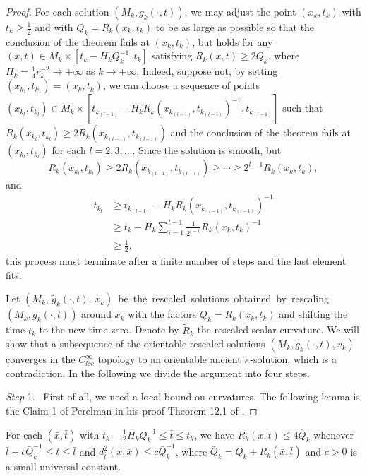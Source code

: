\begin{proof}
For each solution $(M_k,g_k(\cdot,t))$, we may adjust the point
$(x_k,t_k)$ with $t_k\geq \frac{1}{2}$ and with $Q_k=R_k(x_k,t_k)$
to be as large as possible so that the conclusion of the theorem
fails at $(x_k,t_k)$, but holds for any $(x,t)\in M_k\times
[t_k-H_kQ_k^{-1},t_k]$ satisfying $R_k(x,t)\geq 2Q_k$, where
$H_k=\frac{1}{4}r_k^{-2}\rightarrow +\infty$ as $k\rightarrow
+\infty.$  Indeed, suppose not, by setting
$(x_{k_1},t_{k_1})=(x_k,t_k)$, we can choose a sequence of points
$(x_{k_l},t_{k_l})\in M_k\times
[t_{k_{(l-1)}}-H_kR_k(x_{k_{(l-1)}},t_{k_{(l-1)}})^{-1},t_{k_{(l-1)}}]$
such that $R_k(x_{k_l},t_{k_l})\geq
2R_k(x_{k_{(l-1)}},t_{k_{(l-1)}})$ and the conclusion of the
theorem fails at $(x_{k_l},t_{k_l})$ for each $l =2, 3, \ldots.$
 Since the solution is smooth, but
$$
R_k(x_{k_l},t_{k_l})\geq 2R_k(x_{k_{(l-1)}},t_{k_{(l-1)}})\geq
\cdots \geq 2^{l-1}R_k(x_{k},t_{k}),
$$
and
\begin{align*}
t_{k_l}&  \geq
t_{k_{(l-1)}}-H_kR_k(x_{k_{(l-1)}},t_{k_{(l-1)}})^{-1}\\
&  \geq
t_{k}-H_k\sum\limits_{i=1}^{l-1}\frac{1}{2^{i-1}}R_k(x_{k},t_{k})^{-1}\\
&  \geq  \frac{1}{2},
\end{align*}
this process must terminate after a finite number of steps and the
last element fits.

Let\; $(M_k,\,\tilde{g}_k(\cdot,t),\,x_k)$\, be\, the\, rescaled\,
solutions\, obtained\, by\, rescaling $(M_k,g_k(\cdot,t))$ around
$x_k$ with the factors $Q_k=R_k(x_k,t_k)$ and shifting the time
$t_k$ to the new time zero. Denote by $\tilde{R}_k$ the rescaled
scalar curvature.  We will show that a subsequence of the
orientable rescaled solutions $(M_k,\tilde{g}_k(\cdot,t),x_k)$
converges in the $C^{\infty}_{loc}$ topology to an orientable
ancient $\kappa$-solution, which is a contradiction. In the
following we divide the argument into four steps.

\medskip
{\it Step} 1. \ First of all, we need a local bound on curvatures.
The following lemma is the Claim 1 of Perelman in his proof Theorem
12.1 of \cite{P1}.

\end{proof}
\begin{lemma}
  \label{lem:cz-blowup-backward-parabolic-curvature-control}

For each $(\bar{x},\bar{t})$ with $t_k-\frac{1}{2}H_kQ_k^{-1}\leq
\bar{t}\leq t_k$, we have $R_k(x,t)\leq 4\bar{Q}_k$ whenever
$\bar{t}-c\bar{Q}_k^{-1}\leq t\leq \bar{t}$ and
$d^2_{\bar{t}}(x,\bar{x})\leq c\bar{Q}_k^{-1}$, where
$\bar{Q}_k=Q_k+R_k(\bar{x},\bar{t})$ and $c>0$ is a small
universal constant.
\end{lemma}

